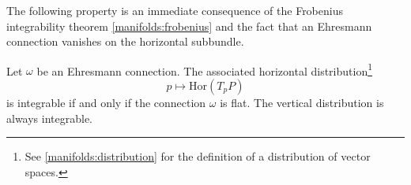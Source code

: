 	The following property is an immediate consequence of the Frobenius integrability theorem \ref{manifolds:frobenius} and the fact that an Ehresmann connection vanishes on the horizontal subbundle.
	\begin{property}
		Let $\omega$ be an Ehresmann connection. The associated horizontal distribution\footnote{See \ref{manifolds:distribution} for the definition of a distribution of vector spaces.}\[p\mapsto\text{Hor}(T_pP)\]is integrable if and only if the connection $\omega$ is flat. The vertical distribution is always integrable.
	\end{property}
